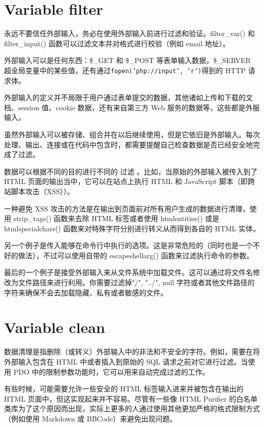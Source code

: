 \section{Variable filter}


永远不要信任外部输入，务必在使用外部输入前进行过滤和验证。filter\_var() 和 filter\_input() 函数可以过滤文本并对格式进行校验（例如 email 地址）。

外部输入可以是任何东西：\$\_GET 和 \$\_POST 等表单输入数据，\$\_SERVER 超全局变量中的某些值，还有通过\texttt{fopen('php://input', 'r')}得到的 HTTP 请求体。

外部输入的定义并不局限于用户通过表单提交的数据，其他诸如上传和下载的文档、session 值、cookie 数据，还有来自第三方 Web 服务的数据等，这些都是外服输入。

虽然外部输入可以被存储、组合并在以后继续使用，但是它依旧是外部输入。每次处理、输出、连接或在代码中包含时，都需要提醒自己检查数据是否已经安全地完成了过滤。

数据可以根据不同的目的进行不同的 过滤 。比如，当原始的外部输入被传入到了 HTML 页面的输出当中，它可以在站点上执行 HTML 和 JavaScript 脚本（即跨站脚本攻击（XSS））。

一种避免 XSS 攻击的方法是在输出到页面前对所有用户生成的数据进行清理，使用 strip\_tags() 函数来去除 HTML 标签或者使用 htmlentities() 或是 htmlspecialchars() 函数来对特殊字符分别进行转义从而得到各自的 HTML 实体。

另一个例子是传入能够在命令行中执行的选项。这是非常危险的（同时也是一个不好的做法），不过可以使用自带的 escapeshellarg() 函数来过滤执行命令的参数。

最后的一个例子是接受外部输入来从文件系统中加载文件。这可以通过将文件名修改为文件路径来进行利用。你需要过滤掉"/", "../", null 字符或者其他文件路径的字符来确保不会去加载隐藏、私有或者敏感的文件。

\section{Variable clean}

数据清理是指删除（或转义）外部输入中的非法和不安全的字符。例如，需要在将外部输入包含在 HTML 中或者插入到原始的 SQL 请求之前对它进行过滤。当使用 PDO 中的限制参数功能时，它可以用来自动完成过滤的工作。

有些时候，可能需要允许一些安全的 HTML 标签输入进来并被包含在输出的 HTML 页面中，但这实现起来并不容易。尽管有一些像 HTML Purifier 的白名单类库为了这个原因而出现，实际上更多的人通过使用其他更加严格的格式限制方式（例如使用 Markdown 或 BBCode）来避免出现问题。

